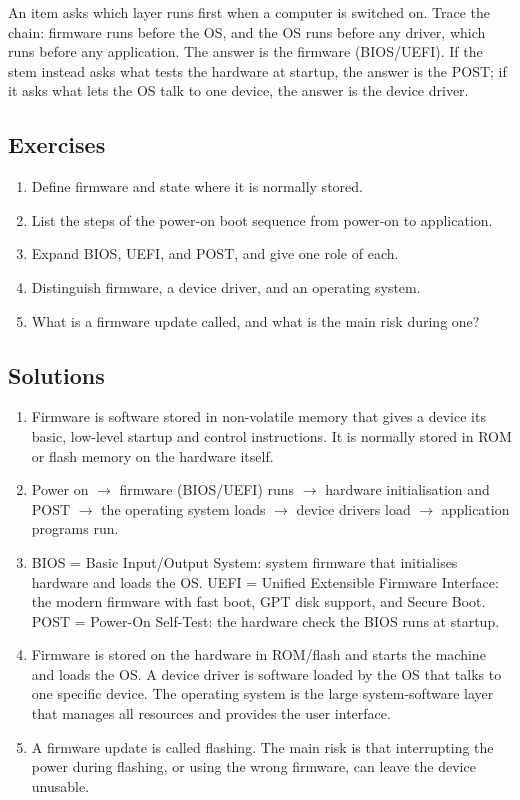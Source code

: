 \begin{example}
An item asks which layer runs first when a computer is switched on. Trace the
chain: firmware runs before the OS, and the OS runs before any driver, which
runs before any application. The answer is the firmware (BIOS/UEFI). If the
stem instead asks what tests the hardware at startup, the answer is the POST;
if it asks what lets the OS talk to one device, the answer is the device
driver.
\end{example}

\subsection*{Exercises}
\begin{enumerate}[label=\arabic*.]
  \item Define firmware and state where it is normally stored.
  \item List the steps of the power-on boot sequence from power-on to
    application.
  \item Expand BIOS, UEFI, and POST, and give one role of each.
  \item Distinguish firmware, a device driver, and an operating system.
  \item What is a firmware update called, and what is the main risk during
    one?
\end{enumerate}

\subsection*{Solutions}
\begingroup\small
\begin{enumerate}[label=\arabic*.]
  \item Firmware is software stored in non-volatile memory that gives a
    device its basic, low-level startup and control instructions. It is
    normally stored in ROM or flash memory on the hardware itself.
  \item Power on $\rightarrow$ firmware (BIOS/UEFI) runs $\rightarrow$
    hardware initialisation and POST $\rightarrow$ the operating system
    loads $\rightarrow$ device drivers load $\rightarrow$ application
    programs run.
  \item BIOS = Basic Input/Output System: system firmware that initialises
    hardware and loads the OS. UEFI = Unified Extensible Firmware Interface:
    the modern firmware with fast boot, GPT disk support, and Secure Boot.
    POST = Power-On Self-Test: the hardware check the BIOS runs at startup.
  \item Firmware is stored on the hardware in ROM/flash and starts the
    machine and loads the OS. A device driver is software loaded by the OS
    that talks to one specific device. The operating system is the large
    system-software layer that manages all resources and provides the user
    interface.
  \item A firmware update is called flashing. The main risk is that
    interrupting the power during flashing, or using the wrong firmware, can
    leave the device unusable.
\end{enumerate}
\endgroup

